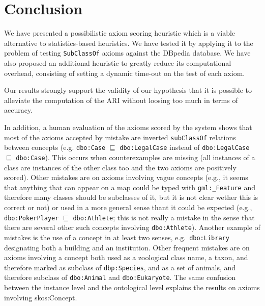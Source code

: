 \documentclass{sig-alternate}
\begin{document}


\section{Conclusion}\label{conclusion}

We have presented a possibilistic axiom scoring heuristic which is a viable
alternative to statistics-based heuristics. We have tested it by applying it to the
problem of testing \texttt{SubClassOf} axioms against the DBpedia database.
We have also proposed an additional heuristic to greatly reduce its computational
overhead, consisting of setting a dynamic time-out on the test of each axiom.

Our results strongly support the validity of our hypothesis
that it is possible to alleviate the computation of the ARI without loosing too much
in terms of accuracy.

In addition, a human evaluation of the axioms scored by the system shows that
most of the axioms accepted by mistake are inverted \texttt{subClassOf} relations between concepts (e.g. \texttt{dbo:Case} $\sqsubseteq$ \texttt{dbo:LegalCase} instead of \texttt{dbo:LegalCase} $\sqsubseteq$ \texttt{dbo:Case}). This occurs when counterexamples are missing (all instances of a class are instances of the other class too and the two axioms are positively scored).
Other mistakes are on axioms involving vague concepts (e.g., it seems that anything that can appear on a map could be typed with \texttt{gml:\_Feature} and therefore many classes should be subclasses of it, but it is not clear wether this is correct or not) or used in a more general sense thant it could be expected (e.g., \texttt{dbo:PokerPlayer} $\sqsubseteq$ \texttt{dbo:Athlete}; this is not really a mistake in the sense that there are several other such concepts involving \texttt{dbo:Athlete}).
Another example of mistakes is the use of a concept in at least two senses, e.g.\ \texttt{dbo:Library} designating both a building and an institution.
Other frequent mistakes are on axioms involving a concept both used as a zoological class name, a taxon, and therefore marked as subclass of \texttt{dbp:Species}, and as a set of animals, and therefore subclass of \texttt{dbo:Animal} and \texttt{dbo:Eukaryote}.
The same confusion between the instance level and the ontological level explains the results on axioms involving \textsf{skos:Concept}.
 
\end{document}
